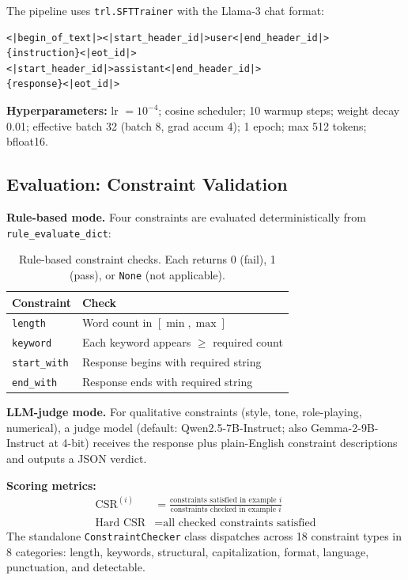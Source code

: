 \documentclass[10pt]{article}
\begin{document}
The pipeline uses \texttt{trl.SFTTrainer} with the Llama-3 chat format:

\begin{lstlisting}
<|begin_of_text|><|start_header_id|>user<|end_header_id|>
{instruction}<|eot_id|>
<|start_header_id|>assistant<|end_header_id|>
{response}<|eot_id|>
\end{lstlisting}

\textbf{Hyperparameters:} lr $= 10^{-4}$; cosine scheduler; 10 warmup
steps; weight decay 0.01; effective batch 32 (batch 8, grad accum 4); 1
epoch; max 512 tokens; bfloat16.

\subsection{Evaluation: Constraint Validation}

\textbf{Rule-based mode.} Four constraints are evaluated deterministically
from \texttt{rule\_evaluate\_dict}:

\begin{table}[H]
\centering
\caption{Rule-based constraint checks. Each returns 0 (fail), 1 (pass),
or \texttt{None} (not applicable).}
\label{tab:rule_checks}
\small
\begin{tabular}{ll}
\toprule
\textbf{Constraint} & \textbf{Check} \\
\midrule
\texttt{length}      & Word count in $[\min, \max]$ \\
\texttt{keyword}     & Each keyword appears $\geq$ required count \\
\texttt{start\_with} & Response begins with required string \\
\texttt{end\_with}   & Response ends with required string \\
\bottomrule
\end{tabular}
\end{table}

\textbf{LLM-judge mode.} For qualitative constraints (style, tone,
role-playing, numerical), a judge model (default: Qwen2.5-7B-Instruct;
also Gemma-2-9B-Instruct at 4-bit) receives the response plus
plain-English constraint descriptions and outputs a JSON verdict.

\textbf{Scoring metrics:}
\begin{align}
  \text{CSR}^{(i)} &= \frac{\text{constraints satisfied in example } i}
                          {\text{constraints checked in example } i} \\
  \text{Hard CSR}  &= \text{all checked constraints satisfied}
\end{align}
The standalone \texttt{ConstraintChecker} class dispatches across 18
constraint types in 8 categories: length, keywords, structural,
capitalization, format, language, punctuation, and detectable.
\end{document}
